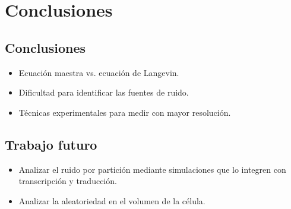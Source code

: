 \documentclass[xcolor=dvipsnames]{beamer}
\begin{document}

\section{Conclusiones}
\subsection{Conclusiones}
\begin{frame}
\begin{itemize}
\item Ecuaci\'on maestra vs. ecuaci\'on de Langevin.
\item Dificultad para identificar las fuentes de ruido.
\item T\'ecnicas experimentales para medir con mayor resoluci\'on.
\end{itemize}
\end{frame}
\subsection{Trabajo futuro}
\begin{frame}
\begin{itemize}

\item Analizar el ruido por partici\'on mediante simulaciones que lo integren con transcripci\'on y traducci\'on.
\item Analizar la aleatoriedad en el volumen de la c\'elula.

\end{itemize}
\end{frame}

\begin{frame}[allowframebreaks]
\printbibliography
\end{frame}
\end{document}
